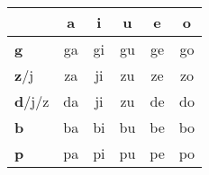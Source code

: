 






\bigskip
\begin{center}
\Huge

\begin{tabular}{m{2.5cm}||c|c|c|c|c|}
          &\textbf{a}& \textbf{i}& \textbf{u}& \textbf{e}& \textbf{o}\\ \hline \hline
\textbf{g}&ga&gi&gu&ge&go\\ \hline
\textbf{z}/j&za&ji&zu&ze&zo\\ \hline
\textbf{d}/j/z&da&ji&zu&de&do\\ \hline
\textbf{b}&ba&bi&bu&be&bo\\ \hline
\textbf{p}&pa&pi&pu&pe&po\\ \hline
\end{tabular}
\end{center}
